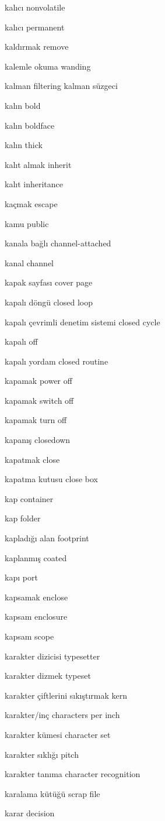\documentclass[12pt,fleqn]{article}\usepackage{../../common}
\begin{document}
kalıcı nonvolatile

kalıcı permanent

kaldırmak remove

kalemle okuma wanding

kalman filtering kalman süzgeci

kalın bold

kalın boldface

kalın thick

kalıt almak inherit

kalıt inheritance

kaçmak escape

kamu public

kanala bağlı channel-attached

kanal channel

kapak sayfası cover page

kapalı döngü closed loop

kapalı çevrimli denetim sistemi closed cycle

kapalı off

kapalı yordam closed routine

kapamak power off

kapamak switch off

kapamak turn off

kapanış closedown

kapatmak close

kapatma kutusu close box

kap container

kap folder

kapladığı alan footprint

kaplanmış coated

kapı port

kapsamak enclose

kapsam enclosure

kapsam scope

karakter dizicisi typesetter

karakter dizmek typeset

karakter çiftlerini sıkıştırmak kern

karakter/inç characters per inch

karakter kümesi character set

karakter sıklığı pitch

karakter tanıma character recognition

karalama kütüğü scrap file

karar decision
\end{document}
